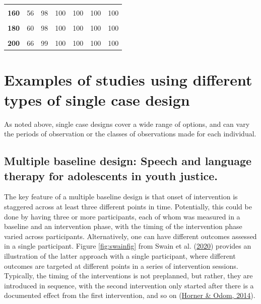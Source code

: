 \documentclass{krantz}
\begin{document}
\begin{table}
\begin{tabular}[t]{>{}ccccccc}
\textbf{\cellcolor{gray!6}{150}} & \cellcolor{gray!6}{52} & \cellcolor{gray!6}{97} & \cellcolor{gray!6}{100} & \cellcolor{gray!6}{100} & \cellcolor{gray!6}{100} & \cellcolor{gray!6}{100}\\
\addlinespace
\textbf{160} & 56 & 98 & 100 & 100 & 100 & 100\\
\textbf{\cellcolor{gray!6}{170}} & \cellcolor{gray!6}{57} & \cellcolor{gray!6}{98} & \cellcolor{gray!6}{100} & \cellcolor{gray!6}{100} & \cellcolor{gray!6}{100} & \cellcolor{gray!6}{100}\\
\textbf{180} & 60 & 98 & 100 & 100 & 100 & 100\\
\textbf{\cellcolor{gray!6}{190}} & \cellcolor{gray!6}{61} & \cellcolor{gray!6}{99} & \cellcolor{gray!6}{100} & \cellcolor{gray!6}{100} & \cellcolor{gray!6}{100} & \cellcolor{gray!6}{100}\\
\textbf{200} & 66 & 99 & 100 & 100 & 100 & 100\\
\bottomrule
\end{tabular}
\end{table}

\hypertarget{examples-of-studies-using-different-types-of-single-case-design}{%
\section{Examples of studies using different types of single case design}\label{examples-of-studies-using-different-types-of-single-case-design}}

As noted above, single case designs cover a wide range of options, and can vary the periods of observation or the classes of observations made for each individual.

\hypertarget{multiple-baseline-design-speech-and-language-therapy-for-adolescents-in-youth-justice.}{%
\subsection{Multiple baseline design: Speech and language therapy for adolescents in youth justice.}\label{Multiple-baseline-design-speech-and-language-therapy-for-adolescents-in-youth-justice.}}

The key feature of a multiple baseline design is that onset of intervention is staggered across at least three different points in time. Potentially, this could be done by having three or more participants, each of whom was measured in a baseline and an intervention phase, with the timing of the intervention phase varied across participants. Alternatively, one can have different outcomes assessed in a single participant. Figure \ref{fig:swainfig} from Swain et al. (\protect\hyperlink{ref-swain2020}{2020}) provides an illustration of the latter approach with a single participant, where different outcomes are targeted at different points in a series of intervention sessions. Typically, the timing of the interventions is not preplanned, but rather, they are introduced in sequence, with the second intervention only started after there is a documented effect from the first intervention, and so on (\protect\hyperlink{ref-horner2014}{Horner \& Odom, 2014}).
\end{document}

